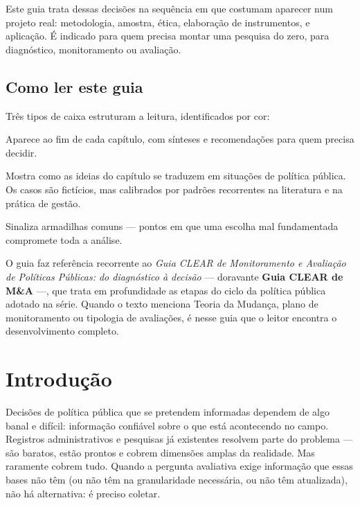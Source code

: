 \documentclass[12pt, a4paper, openany]{book}
\begin{document}
Este guia trata dessas decisões na sequência em que costumam aparecer num
projeto real: metodologia, amostra, ética, elaboração de instrumentos, e
aplicação. É indicado para quem precisa montar uma pesquisa do zero, para
diagnóstico, monitoramento ou avaliação.
\newpage

\thispagestyle{empty}
\section*{Como ler este guia}
Três tipos de caixa estruturam a leitura, identificados por cor:
\vspace{0.3cm}
\begin{notabox}
Aparece ao fim de cada capítulo, com sínteses e recomendações para quem
precisa decidir.
\end{notabox}
\begin{exemplobox}
Mostra como as ideias do capítulo se traduzem em situações de política
pública. Os casos são fictícios, mas calibrados por padrões recorrentes
na literatura e na prática de gestão.
\end{exemplobox}
\begin{atencaobox}
Sinaliza armadilhas comuns --- pontos em que uma escolha mal fundamentada
compromete toda a análise.
\end{atencaobox}
\vspace{0.5cm}
\noindent O guia faz referência recorrente ao \textit{Guia CLEAR de
Monitoramento e Avaliação de Políticas Públicas: do diagnóstico à decisão}
\citep{Lima2025} --- doravante \textbf{Guia CLEAR de M\&A} ---, que trata
em profundidade as etapas do ciclo da política pública adotado na série.
Quando o texto menciona Teoria da Mudança, plano de monitoramento ou
tipologia de avaliações, é nesse guia que o leitor encontra o
desenvolvimento completo.
\newpage

\tableofcontents
\newpage


\chapter{Introdu\c{c}\~ao}

Decis\~oes de pol\'itica p\'ublica que se pretendem informadas dependem de algo banal e dif\'icil: informa\c{c}\~ao confi\'avel sobre o que est\'a acontecendo no campo. Registros administrativos e pesquisas j\'a existentes resolvem parte do problema --- s\~ao baratos, est\~ao prontos e cobrem dimens\~oes amplas da realidade. Mas raramente cobrem tudo. Quando a pergunta avaliativa exige informa\c{c}\~ao que essas bases n\~ao t\^em (ou n\~ao t\^em na granularidade necess\'aria, ou n\~ao t\^em atualizada), n\~ao h\'a alternativa: \'e preciso coletar.
\end{document}
